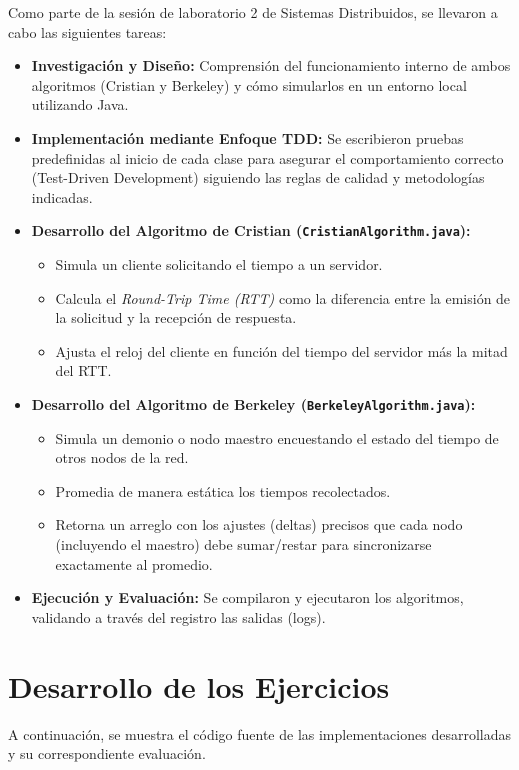\documentclass{article}
\begin{document}
Como parte de la sesión de laboratorio 2 de Sistemas Distribuidos, se llevaron a cabo las siguientes tareas:
\begin{itemize}
    \item \textbf{Investigación y Diseño:} Comprensión del funcionamiento interno de ambos algoritmos (Cristian y Berkeley) y cómo simularlos en un entorno local utilizando Java.
    \item \textbf{Implementación mediante Enfoque TDD:} Se escribieron pruebas predefinidas al inicio de cada clase para asegurar el comportamiento correcto (Test-Driven Development) siguiendo las reglas de calidad y metodologías indicadas.
    \item \textbf{Desarrollo del Algoritmo de Cristian (\texttt{CristianAlgorithm.java}):}
    \begin{itemize}
        \item Simula un cliente solicitando el tiempo a un servidor.
        \item Calcula el \textit{Round-Trip Time (RTT)} como la diferencia entre la emisión de la solicitud y la recepción de respuesta.
        \item Ajusta el reloj del cliente en función del tiempo del servidor más la mitad del RTT.
    \end{itemize}
    \item \textbf{Desarrollo del Algoritmo de Berkeley (\texttt{BerkeleyAlgorithm.java}):}
    \begin{itemize}
        \item Simula un demonio o nodo maestro encuestando el estado del tiempo de otros nodos de la red.
        \item Promedia de manera estática los tiempos recolectados.
        \item Retorna un arreglo con los ajustes (deltas) precisos que cada nodo (incluyendo el maestro) debe sumar/restar para sincronizarse exactamente al promedio.
    \end{itemize}
    \item \textbf{Ejecución y Evaluación:} Se compilaron y ejecutaron los algoritmos, validando a través del registro las salidas (logs).
\end{itemize}

\section{Desarrollo de los Ejercicios}

A continuación, se muestra el código fuente de las implementaciones desarrolladas y su correspondiente evaluación.
\end{document}
